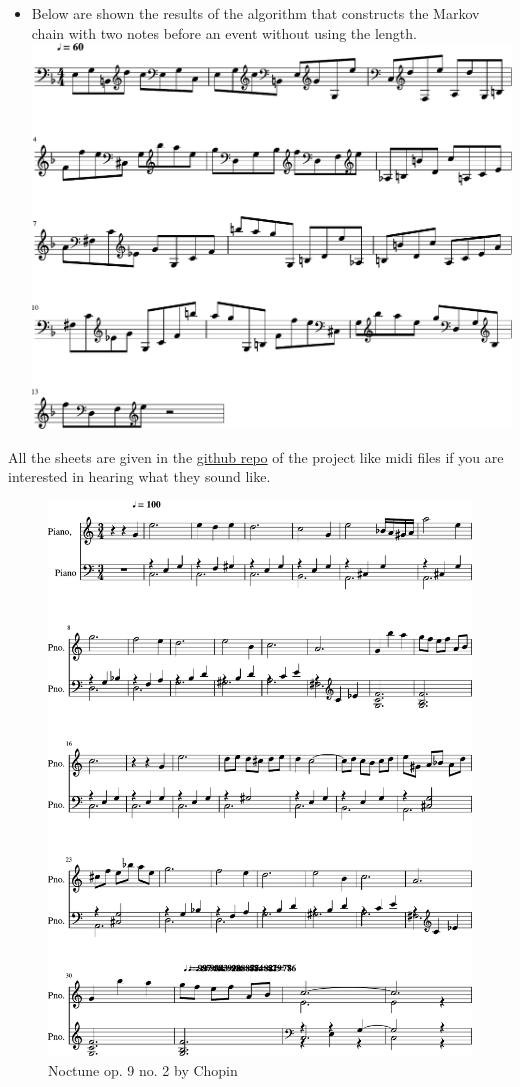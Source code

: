 \documentclass[]{article}
\begin{document}
\begin{itemize}
            \item Below are shown the results of the algorithm that constructs the Markov chain with two notes before an event without using the length.\\
            \includegraphics[scale=0.6]{result_pair_notes}
        \end{itemize} 
        All the sheets are given in the \href{https://github.com/Ro6afF/compmus/tree/master/doc}{github repo} of the project like midi files if you are interested in hearing what they sound like.
        \begin{figure}[h!]
            \includegraphics[scale=0.7]{original}
            \caption{Noctune op. 9 no. 2 by Chopin}
            \label{fig:original}
        \end{figure}
\end{document}
